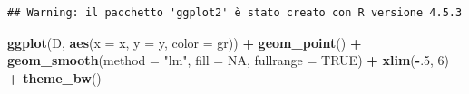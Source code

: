 \documentclass[
]{article}
\newenvironment{Shaded}{\begin{snugshade}}{\end{snugshade}}
\newcommand{\AttributeTok}[1]{\textcolor[rgb]{0.13,0.29,0.53}{#1}}
\newcommand{\ConstantTok}[1]{\textcolor[rgb]{0.56,0.35,0.01}{#1}}
\newcommand{\DecValTok}[1]{\textcolor[rgb]{0.00,0.00,0.81}{#1}}
\newcommand{\FunctionTok}[1]{\textcolor[rgb]{0.13,0.29,0.53}{\textbf{#1}}}
\newcommand{\NormalTok}[1]{#1}
\newcommand{\OtherTok}[1]{\textcolor[rgb]{0.56,0.35,0.01}{#1}}
\newcommand{\SpecialCharTok}[1]{\textcolor[rgb]{0.81,0.36,0.00}{\textbf{#1}}}
\newcommand{\StringTok}[1]{\textcolor[rgb]{0.31,0.60,0.02}{#1}}
\begin{document}
\begin{Shaded}
\end{Shaded}

\begin{verbatim}
## Warning: il pacchetto 'ggplot2' è stato creato con R versione 4.5.3
\end{verbatim}

\begin{Shaded}
\begin{Highlighting}[]
\FunctionTok{ggplot}\NormalTok{(D, }\FunctionTok{aes}\NormalTok{(}\AttributeTok{x =}\NormalTok{ x, }\AttributeTok{y =}\NormalTok{ y, }\AttributeTok{color =}\NormalTok{ gr)) }\SpecialCharTok{+}
  \FunctionTok{geom\_point}\NormalTok{() }\SpecialCharTok{+}
  \FunctionTok{geom\_smooth}\NormalTok{(}\AttributeTok{method =} \StringTok{"lm"}\NormalTok{, }\AttributeTok{fill =} \ConstantTok{NA}\NormalTok{, }\AttributeTok{fullrange =} \ConstantTok{TRUE}\NormalTok{) }\SpecialCharTok{+}
  \FunctionTok{xlim}\NormalTok{(}\SpecialCharTok{{-}}\NormalTok{.}\DecValTok{5}\NormalTok{, }\DecValTok{6}\NormalTok{) }\SpecialCharTok{+}
  \FunctionTok{theme\_bw}\NormalTok{()}
\end{Highlighting}
\end{Shaded}
\end{document}
